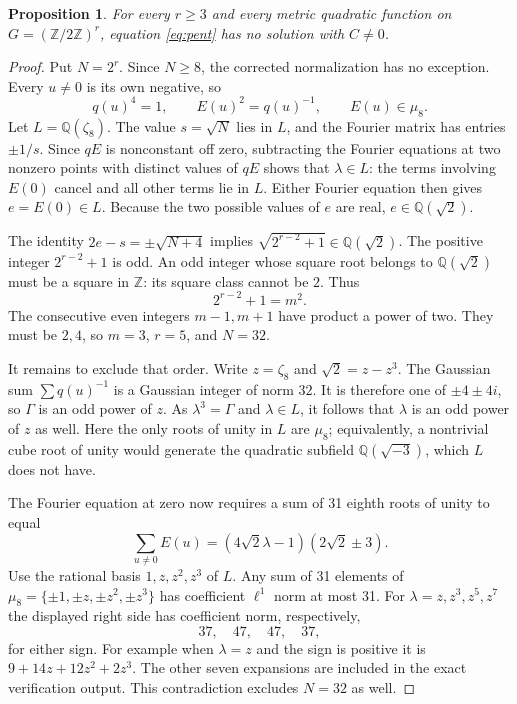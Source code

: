 \documentclass[11pt]{article}
\newtheorem{proposition}[theorem]{Proposition}
\theoremstyle{remark}
\newcommand{\Q}{\mathbb Q}
\newcommand{\Z}{\mathbb Z}
\begin{document}
\begin{proposition}
For every $r\ge3$ and every metric quadratic function on
$G=(\Z/2\Z)^r$, equation \eqref{eq:pent} has no solution with $C\ne0$.
\end{proposition}
\begin{proof}
Put $N=2^r$. Since $N\ge8$, the corrected normalization has no exception.
Every $u\ne0$ is its own negative, so
\[
 q(u)^4=1,\qquad E(u)^2=q(u)^{-1},\qquad E(u)\in\mu_8.
\]
Let $L=\Q(\zeta_8)$. The value $s=\sqrt N$ lies in $L$, and the Fourier
matrix has entries $\pm1/s$. Since $qE$ is nonconstant off zero, subtracting
the Fourier equations at two nonzero points with distinct values of $qE$
shows that $\lambda\in L$: the terms involving $E(0)$ cancel and all other
terms lie in $L$. Either Fourier equation then gives $e=E(0)\in L$.
Because the two possible values of $e$ are real, $e\in\Q(\sqrt2)$.

The identity $2e-s=\pm\sqrt{N+4}$ implies
$\sqrt{2^{r-2}+1}\in\Q(\sqrt2)$. The positive integer $2^{r-2}+1$ is odd.
An odd integer whose square root belongs to $\Q(\sqrt2)$ must be a square
in $\Z$: its square class cannot be $2$. Thus
\[
 2^{r-2}+1=m^2.
\]
The consecutive even integers $m-1,m+1$ have product a power of two. They
must be $2,4$, so $m=3$, $r=5$, and $N=32$.

It remains to exclude that order. Write $z=\zeta_8$ and
$\sqrt2=z-z^3$. The Gaussian sum $\sum q(u)^{-1}$ is a Gaussian integer of
norm $32$. It is therefore one of $\pm4\pm4i$, so $\Gamma$ is an odd power
of $z$. As $\lambda^3=\Gamma$ and $\lambda\in L$, it follows that $\lambda$
is an odd power of $z$ as well. Here the only roots of unity in $L$ are
$\mu_8$; equivalently, a nontrivial cube root of unity would generate the
quadratic subfield $\Q(\sqrt{-3})$, which $L$ does not have.

The Fourier equation at zero now requires a sum of 31 eighth roots of unity
to equal
\[
 \sum_{u\ne0}E(u)=(4\sqrt2\lambda-1)(2\sqrt2\pm3).
\]
Use the rational basis $1,z,z^2,z^3$ of $L$. Any sum of 31 elements of
$\mu_8=\{\pm1,\pm z,\pm z^2,\pm z^3\}$ has coefficient $\ell^1$ norm at
most 31. For $\lambda=z,z^3,z^5,z^7$ the displayed right side has coefficient
norm, respectively,
\[
 37,\quad47,\quad47,\quad37,
\]
for either sign. For example when $\lambda=z$ and the sign is positive it is
$9+14z+12z^2+2z^3$. The other seven expansions are included in the exact
verification output. This contradiction excludes $N=32$ as well.
\end{proof}
\end{document}
